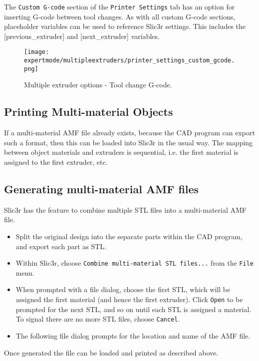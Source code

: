 The \texttt{Custom G-code} section of the \texttt{Printer Settings} tab has an option for inserting G-code between tool changes.  As with all custom G-code sections, placeholder variables can be used to reference Slic3r settings.  This includes the [previous\_extruder] and [next\_extruder] variables.

\begin{figure}[H]
\centering
\texttt{[image: expertmode/multipleextruders/printer\_settings\_custom\_gcode.png]}
\caption{Multiple extruder options - Tool change G-code.}
\label{fig:printer_settings_custom_gcode}
\end{figure}



\subsection{Printing Multi-material Objects} %
\label{sub:printing_multi_material_objects}

If a multi-material AMF file already exists, because the CAD program can export such a format, then this can be loaded into Slic3r in the usual way.  The mapping between object materials and extruders is sequential, i.e. the first material is assigned to the first extruder, etc.



\subsection{Generating multi-material AMF files} %
\label{sub:generating_multi_material_amf_files}

Slic3r has the feature to combine multiple STL files into a multi-material AMF file.

\begin{itemize}
    \item Split the original design into the separate parts within the CAD program, and export each part as STL.
    \item Within Slic3r, choose \texttt{Combine multi-material STL files...} from the \texttt{File} menu.
    \item When prompted with a file dialog, choose the first STL, which will be assigned the first material (and hence the first extruder). Click \texttt{Open} to be prompted for the next STL, and so on until each STL is assigned a material.  To signal there are no more STL files, choose \texttt{Cancel}.
    \item The following file dialog prompts for the location and name of the AMF file.
\end{itemize}

Once generated the file can be loaded and printed as described above.



